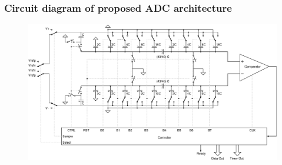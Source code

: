 \begin{frame}
	\frametitle{Circuit diagram of proposed ADC architecture} \footnotesize
	\begin{center}
		\begin{figure}
			\includegraphics[width=10 cm,height=6 cm,angle=360]{Figures/15ADCfull.ps}\\
		\end{figure}
		\scriptsize{ \color{blue}{Proposed level crossing ADC circuit diagram}}
	\end{center}
\end{frame}
